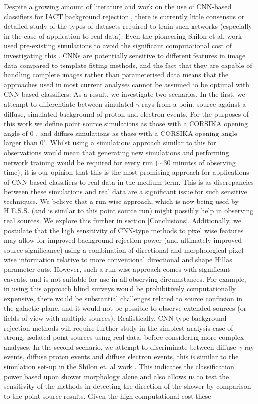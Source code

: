 Despite a growing amount of literature and work on the use of CNN-based classifiers for IACT background rejection \cite{Shilon}\cite{samicrc}\cite{dl1dh}, there is currently little consensus or detailed study of the types of datasets required to train such networks (especially in the case of application to real data). Even the pioneering Shilon et al. work used pre-existing simulations to avoid the significant computational cost of investigating this \cite{Shilon}. CNNs are potentially sensitive to different features in image data compared to template fitting methods, and the fact that they are capable of handling complete images rather than parameterised data means that the approaches used in most current analyses cannot be assumed to be optimal with CNN-based classifiers. As a result, we investigate two scenarios. In the first, we attempt to differentiate between simulated $\gamma$-rays from a point source against a diffuse, simulated background of proton and electron events. For the purposes of this work we define point source simulations as those with a CORSIKA opening angle of $0^{\circ}$, and diffuse simulations as those with a CORSIKA opening angle larger than $0^{\circ}$. Whilst using a simulations approach similar to this for observations would mean that generating new simulations and performing network training would be required for every run ($\sim$30 minutes of observing time), it is our opinion that this is the most promising approach for applications of CNN-based classifiers to real data in the medium term. This is as discrepancies between these simulations and real data are a significant issue for such sensitive techniques. We believe that a run-wise approach, which is now being used by H.E.S.S. \cite{rws} (and is similar to this point source run) might possibly help in observing real sources. We explore this further in section \ref{Conclusions}. Additionally, we postulate that the high sensitivity of CNN-type methods to pixel wise features may allow for improved background rejection power (and ultimately improved source significance) using a combination of directional and morphological pixel wise information relative to more conventional directional and shape Hillas parameter cuts. However, such a run wise approach comes with significant caveats, and is not suitable for use in all observing circumstances. For example, in using this approach blind surveys would be prohibitively computationally expensive, there would be substantial challenges related to source confusion in the galactic plane, and it would not be possible to observe extended sources (or fields of view with multiple sources). Realistically, CNN-type background rejection methods will require further study in the simplest analysis case of strong, isolated point sources using real data, before considering more complex analyses. In the second scenario, we attempt to discriminate between diffuse $\gamma$-ray events, diffuse proton events and diffuse electron events, this is similar to the simulation set-up in the Shilon et. al work \cite{Shilon}. This indicates the classification power based upon shower morphology alone and also allows us to test the sensitivity of the methods in detecting the direction of the shower by comparison to the point source results. Given the high computational cost these 